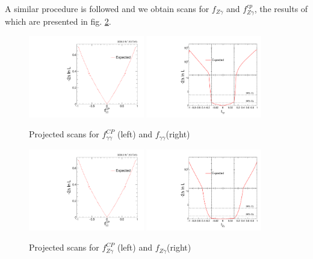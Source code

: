 \documentclass[10pt,a4paper]{article}
\begin{document}
A similar procedure is followed and we obtain scans for $f_{Z\gamma}$ and $f_{Z\gamma}^{cp}$, the results of which are presented in fig. \ref{fig:fzgg}. 




\begin{figure}[t]
\centering
\includegraphics[width=0.45\textwidth]{./output_fggcp.pdf}
\includegraphics[width=0.45\textwidth]{./output_fgg.pdf}
\caption{Projected scans for $f_{\gamma\gamma}^{CP}$ (left) and $f_{\gamma\gamma}$(right)}
\label{fig:fcgg}
\end{figure}



\begin{figure}[t]
\centering
\includegraphics[width=0.45\textwidth]{./output_fggcp.pdf}
\includegraphics[width=0.45\textwidth]{./output_fzg.pdf}
\caption{Projected scans for $f_{Z\gamma}^{CP}$ (left) and $f_{Z\gamma}$(right)}
\label{fig:fzgg}
\end{figure}
\end{document}
